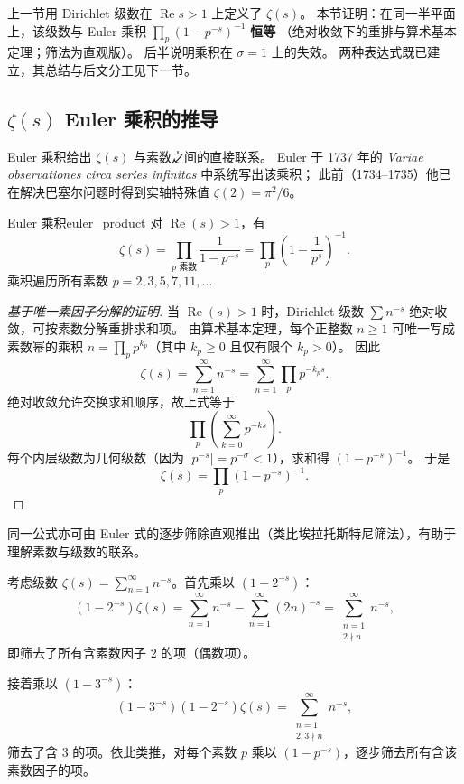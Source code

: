 上一节用 Dirichlet 级数在 $\operatorname{Re}s>1$ 上定义了 $\zeta(s)$。
本节证明：在同一半平面上，该级数与 Euler 乘积
$\prod_p(1-p^{-s})^{-1}$ \textbf{恒等}
（绝对收敛下的重排与算术基本定理；筛法为直观版）。
后半说明乘积在 $\sigma=1$ 上的失效。
两种表达式既已建立，其总结与后文分工见下一节。

\subsection{\texorpdfstring{$\zeta(s)$}{Zeta(s)} Euler 乘积的推导}

Euler 乘积给出 $\zeta(s)$ 与素数之间的直接联系。
Euler 于 1737 年的 \textit{Variae observationes circa series infinitas} 中系统写出该乘积；
此前（1734--1735）他已在解决巴塞尔问题时得到实轴特殊值 $\zeta(2)=\pi^2/6$。

\begin{theorem}{Euler 乘积}{euler_product}
对 $\operatorname{Re}(s) > 1$，有
\begin{equation}
  \boxed{
    \zeta(s) =\prod_{p \text{ 素数}} \frac{1}{1 - p^{-s}}
             =\prod_{p} \left(1 - \frac{1}{p^s}\right)^{-1}.
  }
\end{equation}
乘积遍历所有素数 $p = 2, 3, 5, 7, 11, \ldots$
\end{theorem}

\begin{proof}[基于唯一素因子分解的证明]
当 $\operatorname{Re}(s) > 1$ 时，Dirichlet 级数 $\sum n^{-s}$ 绝对收敛，可按素数分解重排求和项。
由算术基本定理，每个正整数 $n \geq 1$ 可唯一写成素数幂的乘积 $n =\prod_p p^{k_p}$（其中 $k_p \geq 0$ 且仅有限个 $k_p > 0$）。
因此
\[
\zeta(s) =\sum_{n=1}^\infty n^{-s} =\sum_{n=1}^\infty\prod_p p^{-k_p s}.
\]
绝对收敛允许交换求和顺序，故上式等于
\[\prod_p \left(\sum_{k=0}^\infty p^{-k s} \right).
\]
每个内层级数为几何级数（因为 $|p^{-s}| = p^{-\sigma} < 1$），求和得 $(1 - p^{-s})^{-1}$。
于是
\[
\zeta(s) =\prod_p (1 - p^{-s})^{-1}.
\]
\end{proof}


同一公式亦可由 Euler 式的逐步筛除直观推出（类比埃拉托斯特尼筛法），有助于理解素数与级数的联系。

考虑级数 $\zeta(s) =\sum_{n=1}^\infty n^{-s}$。首先乘以 $(1 - 2^{-s})$：
\[
(1 - 2^{-s})\zeta(s) =\sum_{n=1}^\infty n^{-s} -\sum_{n=1}^\infty (2n)^{-s} =\sum_{\substack{n=1 \\ 2 \nmid n}}^\infty n^{-s},
\]
即筛去了所有含素数因子 $2$ 的项（偶数项）。

接着乘以 $(1 - 3^{-s})$：
\[
(1 - 3^{-s})(1 - 2^{-s})\zeta(s) =\sum_{\substack{n=1 \\ 2,3 \nmid n}}^\infty n^{-s},
\]
筛去了含 $3$ 的项。依此类推，对每个素数 $p$ 乘以 $(1 - p^{-s})$，逐步筛去所有含该素数因子的项。

